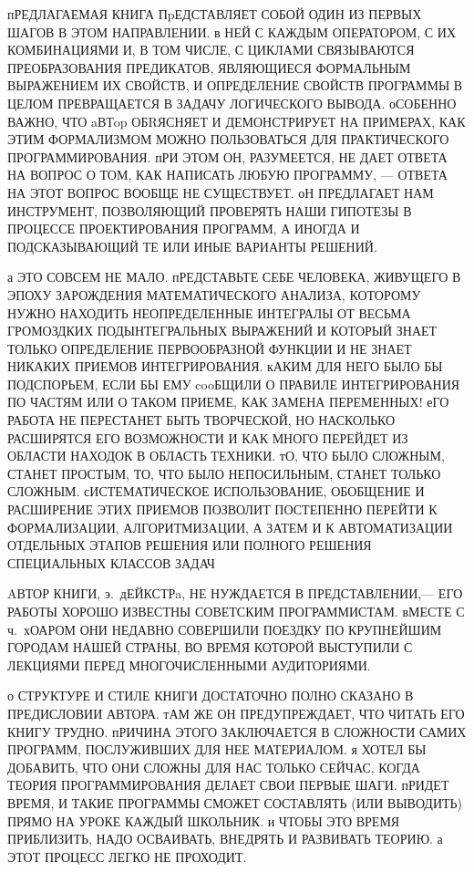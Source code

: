 пРЕДЛАГАЕМАЯ КНИГА ПpЕДСТАВЛЯЕТ СОБОЙ ОДИН ИЗ ПЕРВЫХ ШАГОВ В ЭТОМ НАПРАВЛЕНИИ. 
в НЕЙ С КАЖДЫМ ОПЕРАТОРОМ, С ИХ КОМБИНАЦИЯМИ И, В ТОМ ЧИСЛЕ, С ЦИКЛАМИ 
СВЯЗЫВАЮТСЯ ПРЕОБРАЗОВАНИЯ ПРЕДИКАТОВ, ЯВЛЯЮЩИЕСЯ ФОРМАЛЬНЫМ ВЫРАЖЕНИЕМ ИХ 
СВОЙСТВ, И ОПРЕДЕЛЕНИЕ СВОЙСТВ ПРОГРАММЫ В ЦЕЛОМ ПРЕВРАЩАЕТСЯ В ЗАДАЧУ 
ЛОГИЧЕСКОГО ВЫВОДА. оСОБЕННО ВАЖНО,  ЧТО aВТop ОБRЯСНЯЕТ И ДЕМОНСТРИРУЕТ 
НА ПРИМЕРАХ, КАК ЭТИМ ФОРМАЛИЗМОМ МОЖНО ПОЛЬЗОВАТЬСЯ ДЛЯ ПРАКТИЧЕСКОГО
ПРОГРАММИРОВАНИЯ. пРИ ЭТОМ ОН, РАЗУМЕЕТСЯ, НЕ ДАЕТ ОТВЕТА НА ВОПРОС О 
ТОМ, КАК НАПИСАТЬ ЛЮБУЮ ПРОГРАММУ, --- ОТВЕТА НА ЭТОТ ВОПРОС ВООБЩЕ  НЕ
СУЩЕСТВУЕТ. оН ПРЕДЛАГАЕТ НАМ ИНСТРУМЕНТ, ПОЗВОЛЯЮЩИЙ ПРОВЕРЯТЬ НАШИ  
ГИПОТЕЗЫ В ПРОЦЕССЕ ПРОЕКТИРОВАНИЯ ПРОГРАММ, А ИНОГДА И ПОДСКАЗЫВАЮЩИЙ
ТЕ ИЛИ ИНЫЕ ВАРИАНТЫ РЕШЕНИЙ.
     
а ЭТО СОВСЕМ НЕ МАЛО. пРЕДСТАВЬТЕ СЕБЕ ЧЕЛОВЕКА, ЖИВУЩЕГО В ЭПОХУ 
ЗАРОЖДЕНИЯ МАТЕМАТИЧЕСКОГО АНАЛИЗА, КОТОРОМУ НУЖНО НАХОДИТЬ НЕОПРЕДЕЛЕННЫЕ 
ИНТЕГРАЛЫ ОТ ВЕСЬМА ГРОМОЗДКИХ ПОДЫНТЕГРАЛЬНЫХ ВЫРАЖЕНИЙ И КОТОРЫЙ ЗНАЕТ 
ТОЛЬКО ОПРЕДЕЛЕНИЕ ПЕРВООБРАЗНОЙ ФУНКЦИИ И НЕ ЗНАЕТ НИКАКИХ ПРИЕМОВ 
ИНТЕГРИРОВАНИЯ. кАКИМ ДЛЯ НЕГО БЫЛО БЫ ПОДСПОРЬЕМ, ЕСЛИ БЫ ЕМУ
cooБЩИЛИ О ПРАВИЛЕ ИНТЕГРИРОВАНИЯ ПО ЧАСТЯМ ИЛИ О ТАКОМ ПРИЕМЕ, КАК ЗАМЕНА 
ПЕРЕМЕННЫХ! еГО РАБОТА НЕ ПЕРЕСТАНЕТ БЫТЬ ТВОРЧЕСКОЙ, НО НАСКОЛЬКО РАСШИРЯТСЯ
ЕГО ВОЗМОЖНОСТИ И КАК МНОГО ПЕРЕЙДЕТ ИЗ ОБЛАСТИ НАХОДОК  В ОБЛАСТЬ ТЕХНИКИ. 
тО, ЧТО БЫЛО СЛОЖНЫМ, СТАНЕТ ПРОСТЫМ, ТО, ЧТО БЫЛО НЕПОСИЛЬНЫМ, СТАНЕТ
ТОЛЬКО СЛОЖНЫМ. сИСТЕМАТИЧЕСКОЕ ИСПОЛЬЗОВАНИЕ, ОБОБЩЕНИЕ И РАСШИРЕНИЕ ЭТИХ 
ПРИЕМОВ ПОЗВОЛИТ ПОСТЕПЕННО ПЕРЕЙТИ К ФОРМАЛИЗАЦИИ, АЛГОРИТМИЗАЦИИ, А
ЗАТЕМ И К АВТОМАТИЗАЦИИ ОТДЕЛЬНЫХ ЭТАПОВ РЕШЕНИЯ ИЛИ ПОЛНОГО РЕШЕНИЯ 
СПЕЦИАЛЬНЫХ КЛАССОВ ЗАДАЧ
     
AВТОР КНИГИ, э.~дЕЙКСТРa,   НЕ НУЖДАЕТСЯ В ПРЕДСТАВЛЕНИИ,--- ЕГО РАБОТЫ 
ХОРОШО  ИЗВЕСТНЫ СОВЕТСКИМ ПРОГРАММИСТАМ. вМЕСТЕ С ч.~хОАРОМ ОНИ
НЕДАВНО СОВЕРШИЛИ ПОЕЗДКУ ПО КРУПНЕЙШИМ ГОРОДАМ НАШЕЙ СТРАНЫ, ВО 
ВРЕМЯ КОТОРОЙ ВЫСТУПИЛИ С ЛЕКЦИЯМИ ПЕРЕД МНОГОЧИСЛЕННЫМИ АУДИТОРИЯМИ.

о СТРУКТУРЕ И СТИЛЕ КНИГИ ДОСТАТОЧНО ПОЛНО СКАЗАНО В ПРЕДИСЛОВИИ АВТОРА. 
тАМ ЖЕ ОН ПРЕДУПРЕЖДАЕТ, ЧТО ЧИТАТЬ ЕГО КНИГУ ТРУДНО. пРИЧИНА ЭТОГО 
ЗАКЛЮЧАЕТСЯ В СЛОЖНОСТИ САМИХ ПРОГРАММ, ПОСЛУЖИВШИХ ДЛЯ НЕЕ МАТЕРИАЛОМ. 
я ХОТЕЛ БЫ ДОБАВИТЬ, ЧТО ОНИ СЛОЖНЫ ДЛЯ НАС ТОЛЬКО СЕЙЧАС, КОГДА ТЕОРИЯ 
ПРОГРАММИРОВАНИЯ ДЕЛАЕТ СВОИ ПЕРВЫЕ ШАГИ. пРИДЕТ ВРЕМЯ, И ТАКИЕ ПРОГРАММЫ 
СМОЖЕТ СОСТАВЛЯТЬ (ИЛИ ВЫВОДИТЬ) ПРЯМО НА УРОКЕ КАЖДЫЙ ШКОЛЬНИК. 
и ЧТОБЫ ЭТО ВРЕМЯ ПРИБЛИЗИТЬ, НАДО ОСВАИВАТЬ, ВНЕДРЯТЬ И РАЗВИВАТЬ ТЕОРИЮ. 
а ЭТОТ ПРОЦЕСС ЛЕГКО НЕ ПРОХОДИТ.
     
